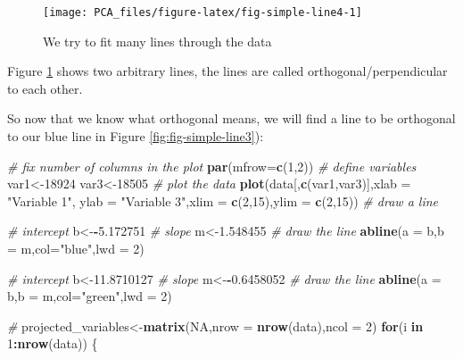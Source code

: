 \documentclass[
]{book}
\newenvironment{Shaded}{\begin{snugshade}}{\end{snugshade}}
\newcommand{\CommentTok}[1]{\textcolor[rgb]{0.56,0.35,0.01}{\textit{#1}}}
\newcommand{\ControlFlowTok}[1]{\textcolor[rgb]{0.13,0.29,0.53}{\textbf{#1}}}
\newcommand{\DataTypeTok}[1]{\textcolor[rgb]{0.13,0.29,0.53}{#1}}
\newcommand{\DecValTok}[1]{\textcolor[rgb]{0.00,0.00,0.81}{#1}}
\newcommand{\FloatTok}[1]{\textcolor[rgb]{0.00,0.00,0.81}{#1}}
\newcommand{\KeywordTok}[1]{\textcolor[rgb]{0.13,0.29,0.53}{\textbf{#1}}}
\newcommand{\NormalTok}[1]{#1}
\newcommand{\OperatorTok}[1]{\textcolor[rgb]{0.81,0.36,0.00}{\textbf{#1}}}
\newcommand{\OtherTok}[1]{\textcolor[rgb]{0.56,0.35,0.01}{#1}}
\newcommand{\StringTok}[1]{\textcolor[rgb]{0.31,0.60,0.02}{#1}}
\theoremstyle{definition}
\theoremstyle{definition}
\theoremstyle{definition}
\theoremstyle{remark}
\begin{document}
\begin{figure}

{\centering \texttt{[image: PCA\_files/figure-latex/fig-simple-line4-1]} 

}

\caption{We try to fit many lines through the data}\label{fig:fig-simple-line4}
\end{figure}

Figure \ref{fig:fig-simple-line4} shows two arbitrary lines, the lines are called orthogonal/perpendicular to each other.

So now that we know what orthogonal means, we will find a line to be orthogonal to our blue line in Figure \ref{fig:fig-simple-line3}):

\begin{Shaded}
\begin{Highlighting}[]
\CommentTok{# fix number of columns in the plot}
\KeywordTok{par}\NormalTok{(}\DataTypeTok{mfrow=}\KeywordTok{c}\NormalTok{(}\DecValTok{1}\NormalTok{,}\DecValTok{2}\NormalTok{))}
\CommentTok{# define variables}
\NormalTok{var1<-}\DecValTok{18924}
\NormalTok{var3<-}\DecValTok{18505}
\CommentTok{# plot the data}
\KeywordTok{plot}\NormalTok{(data[,}\KeywordTok{c}\NormalTok{(var1,var3)],}\DataTypeTok{xlab =} \StringTok{"Variable 1"}\NormalTok{, }\DataTypeTok{ylab =} \StringTok{"Variable 3"}\NormalTok{,}\DataTypeTok{xlim =} \KeywordTok{c}\NormalTok{(}\DecValTok{2}\NormalTok{,}\DecValTok{15}\NormalTok{),}\DataTypeTok{ylim =} \KeywordTok{c}\NormalTok{(}\DecValTok{2}\NormalTok{,}\DecValTok{15}\NormalTok{))}
\CommentTok{# draw a line}

\CommentTok{# intercept}
\NormalTok{b<-}\OperatorTok{-}\FloatTok{5.172751}
\CommentTok{# slope}
\NormalTok{m<-}\FloatTok{1.548455}
\CommentTok{# draw the line}
\KeywordTok{abline}\NormalTok{(}\DataTypeTok{a =}\NormalTok{ b,}\DataTypeTok{b =}\NormalTok{ m,}\DataTypeTok{col=}\StringTok{"blue"}\NormalTok{,}\DataTypeTok{lwd =} \DecValTok{2}\NormalTok{)}

\CommentTok{# intercept}
\NormalTok{b<-}\FloatTok{11.8710127} 
\CommentTok{# slope}
\NormalTok{m<-}\OperatorTok{-}\FloatTok{0.6458052}
\CommentTok{# draw the line}
\KeywordTok{abline}\NormalTok{(}\DataTypeTok{a =}\NormalTok{ b,}\DataTypeTok{b =}\NormalTok{ m,}\DataTypeTok{col=}\StringTok{"green"}\NormalTok{,}\DataTypeTok{lwd =} \DecValTok{2}\NormalTok{)}



\CommentTok{#}
\NormalTok{projected_variables<-}\KeywordTok{matrix}\NormalTok{(}\OtherTok{NA}\NormalTok{,}\DataTypeTok{nrow =} \KeywordTok{nrow}\NormalTok{(data),}\DataTypeTok{ncol =} \DecValTok{2}\NormalTok{)}
\ControlFlowTok{for}\NormalTok{(i }\ControlFlowTok{in} \DecValTok{1}\OperatorTok{:}\KeywordTok{nrow}\NormalTok{(data))}
\NormalTok{\{}


\end{Highlighting}
\end{Shaded}
\end{document}
